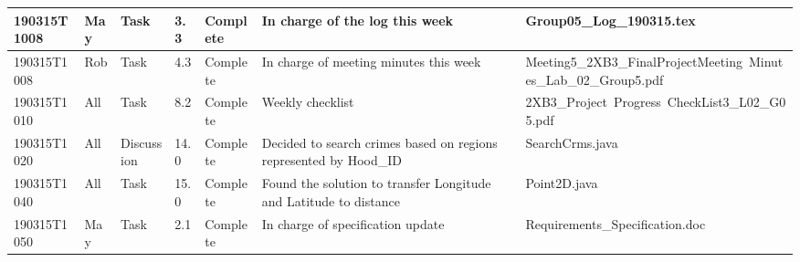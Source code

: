 \documentclass[10pt]{article}
\begin{document}
\begin{tabular}{|p{2cm}| p{1cm}| p{2cm}| p{1cm}| p{1.5cm}| p{4cm}| p{5cm}|}
 \hline 
     190315T1008& May & Task & 3.3 & Complete & In charge of the log this week &  Group05\_Log\_190315.tex\\
 \hline 
  190315T1008& Rob & Task & 4.3 & Complete & In charge of meeting minutes this week &Meeting5\_2XB3\_FinalProjectMeeting\
  Minutes\_Lab\_02\_Group5.pdf\\
  \hline 
     190315T1010& All & Task & 8.2 & Complete &  Weekly checklist & 2XB3\_Project\ Progress\ CheckList3\_L02\_G05.pdf\\
   \hline 
     190315T1020& All & Discussion & 14.0 & Complete &  Decided to search crimes based on regions represented by Hood\_ID & SearchCrms.java\\
  \hline 
   190315T1040&  All & Task & 15.0 & Complete & Found the solution to transfer Longitude and Latitude to distance& Point2D.java\\
 \hline 
  190315T1050&  May & Task & 2.1 & Complete & In charge of specification update & Requirements\_Specification.doc\\
 \hline
 \end{tabular}
 
\end{document}
